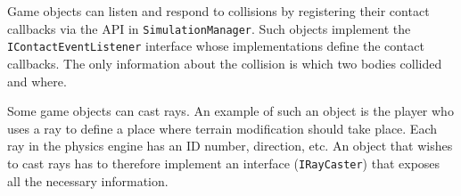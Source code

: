 Game objects can listen and respond to collisions by registering their contact callbacks via the API in \texttt{SimulationManager}.
Such objects implement the \texttt{IContactEventListener} interface whose implementations define the contact callbacks.
The only information about the collision is which two bodies collided and where.

Some game objects can cast rays.
An example of such an object is the player who uses a ray to define a place where terrain modification should take place.
Each ray in the physics engine has an ID number, direction, etc.
An object that wishes to cast rays has to therefore implement an interface (\texttt{IRayCaster}) that exposes all the necessary information.

